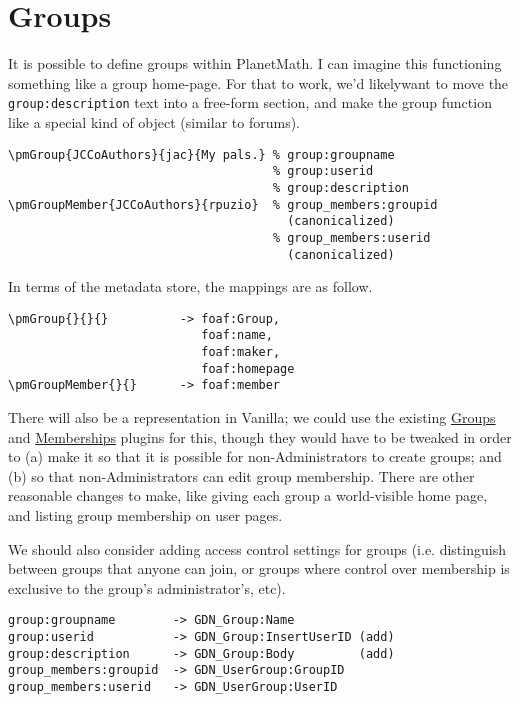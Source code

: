 \documentclass{article}
\begin{document}
\section{Groups}

It is possible to define groups within PlanetMath.  I can
imagine this functioning something like a group home-page.
For that to work, we'd likelywant to move the
\verb|group:description| text into a free-form section,
and make the group function like a special kind of object
(similar to forums).

\begin{verbatim}
\pmGroup{JCCoAuthors}{jac}{My pals.} % group:groupname
                                     % group:userid
                                     % group:description
\pmGroupMember{JCCoAuthors}{rpuzio}  % group_members:groupid
                                       (canonicalized)
                                     % group_members:userid
                                       (canonicalized)
\end{verbatim}

In terms of the metadata store, the mappings are as
follow.

\begin{verbatim}
\pmGroup{}{}{}          -> foaf:Group,
                           foaf:name,
                           foaf:maker,
                           foaf:homepage
\pmGroupMember{}{}      -> foaf:member
\end{verbatim}

There will also be a representation in Vanilla; we could use
the existing
\href{http://vanillaforums.org/addon/groups-plugin}{Groups}
and
\href{http://vanillaforums.org/addon/memberships-plugin}{Memberships}
plugins for this, though they would have to be tweaked in
order to (a) make it so that it is possible for
non-Administrators to create groups; and (b) so that
non-Administrators can edit group membership.  There are
other reasonable changes to make, like giving each group a
world-visible home page, and listing group membership on
user pages.

We should also consider adding access control settings for
groups (i.e. distinguish between groups that anyone can
join, or groups where control over membership is exclusive
to the group's administrator's, etc).

\begin{verbatim}
group:groupname        -> GDN_Group:Name
group:userid           -> GDN_Group:InsertUserID (add)
group:description      -> GDN_Group:Body         (add)
group_members:groupid  -> GDN_UserGroup:GroupID
group_members:userid   -> GDN_UserGroup:UserID
\end{verbatim}
\end{document}
